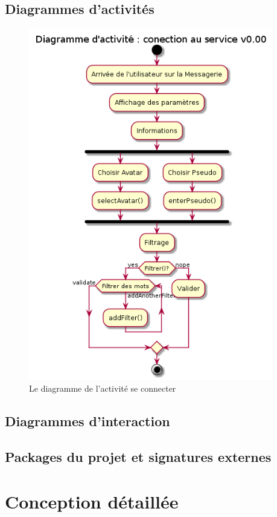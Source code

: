 \documentclass[11pt,dvipsnames,svgnames]{report}
\begin{document}
\section{Diagrammes d'activités}
\begin{figure}[H]
\centerline{\includegraphics[width=0.95\textwidth]{diagrammes/activity-settings-diag.png}}
\caption{Le diagramme de l'activité se connecter}
\end{figure}

\section{Diagrammes d’interaction}

\section{Packages du projet et signatures externes}

\chapter{Conception détaillée}
\end{document}

